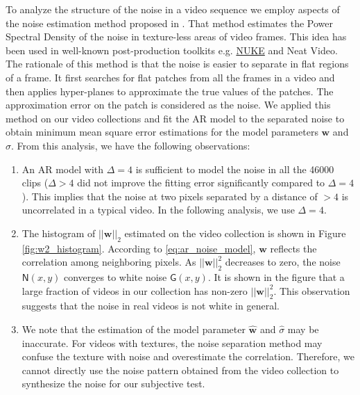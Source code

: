 \documentclass{sig-alternate}
\newcommand{\vect}[1]{\boldsymbol{#1}} %
\begin{document}
To analyze the structure of the noise in a video sequence we employ aspects of the noise estimation method proposed in \cite{KokKelDenCra2016}. That method estimates the Power Spectral Density of the noise in texture-less areas of video frames. This idea has been used in well-known post-production toolkits e.g. \href{http://www.thefoundry.co.uk}{NUKE} and Neat Video. The rationale of this method is that the noise is easier to separate in flat regions of a frame. It first searches for flat patches from all the frames in a video and then applies hyper-planes to approximate the true values of the patches. The approximation error on the patch is considered as the noise. We applied this method on our video collections and fit the AR model to the separated noise to obtain minimum mean square error estimations for the model parameters $\vect{w}$ and $\sigma$. From this analysis, we have the following observations:
\begin{enumerate}[leftmargin=*]
\item An AR model with $\Delta=4$ is sufficient to model the noise in all the 46000 clips ($\Delta>4$ did not improve the fitting error significantly compared to $\Delta=4$). This implies that the noise at two pixels separated by a distance of $>4$ is uncorrelated in a typical video. In the following analysis, we use $\Delta=4$.
\item The histogram of $||\vect{w}||_2$ estimated on the video collection is shown in Figure \ref{fig:w2_histogram}. According to \eqref{eq:ar_noise_model}, $\vect{w}$ reflects the correlation among neighboring pixels. As $||\vect{w}||_2^2$ decreases to zero, the noise $\mathsf{N}(x,y)$ converges to white noise $\mathsf{G}(x,y)$. It is shown in the figure that a large fraction of videos in our collection has non-zero $||\vect{w}||_2^2$. This observation suggests that the noise in real videos is not white in general.
\item We note that the estimation of the model parameter $\vect{\hat w}$ and $\hat\sigma$ may be inaccurate. For videos with textures, the noise separation method may confuse the texture with noise and overestimate the correlation. Therefore, we cannot directly use the noise pattern obtained from the video collection to synthesize the noise for our subjective test.  
\end{enumerate}
\end{document}
